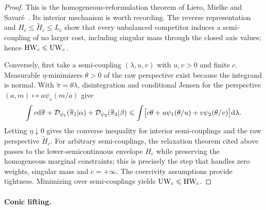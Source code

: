 \begin{proof}
	This is the homogeneous-reformulation theorem of Liero, Mielke and Savar\'e~\cite[Theorems~5.5 and~5.8]{LieroMielkeSavareLong}. Its interior mechanism is worth recording. The reverse representation and $H_c\leq\widetilde H_c\leq L_c$ show that every unbalanced competitor induces a semi-coupling of no larger cost, including singular mass through the closed axis values; hence $\operatorname{HW}_c\leqslant\operatorname{UW}_c$.

	Conversely, first take a semi-coupling $(\lambda,u,v)$ with $u,v>0$ and finite $c$. Measurable $\eta$-minimizers $\theta>0$ of the raw perspective exist because the integrand is normal. With $\widetilde\pi=\theta\lambda$, disintegration and conditional Jensen for the perspective $(a,m)\mapsto a\psi_s(m/a)$ give
	\[
		\int c\mathrm{d}\widetilde\pi
		+\mathcal{D}_{\psi_1}(\widetilde\pi_1|\alpha)
		+\mathcal{D}_{\psi_2}(\widetilde\pi_2|\beta)
		\leqslant
		\int\bigl[c\theta+u\psi_1(\theta/u)+v\psi_2(\theta/v)\bigr]\mathrm{d}\lambda.
	\]
	Letting $\eta\downarrow0$ gives the converse inequality for interior semi-couplings and the raw perspective $\widetilde H_c$. For arbitrary semi-couplings, the relaxation theorem cited above passes to the lower-semicontinuous envelope $H_c$ while preserving the homogeneous marginal constraints; this is precisely the step that handles zero weights, singular mass and $c=+\infty$. The coercivity assumptions provide tightness. Minimizing over semi-couplings yields $\operatorname{UW}_c\leqslant\operatorname{HW}_c$.
\end{proof}

\paragraph{Conic lifting.}

